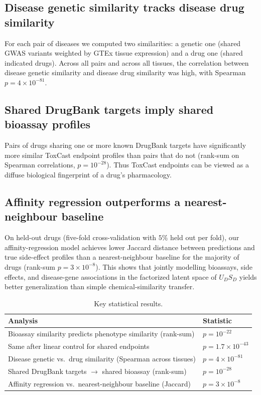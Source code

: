 \documentclass[11pt]{article}
\begin{document}
\subsection{Disease genetic similarity tracks disease drug similarity}
For each pair of diseases we computed two similarities: a genetic one (shared GWAS variants weighted by GTEx tissue expression) and a drug one (shared indicated drugs). Across all pairs and across all tissues, the correlation between disease genetic similarity and disease drug similarity was high, with Spearman $p = 4 \times 10^{-81}$.

\subsection{Shared DrugBank targets imply shared bioassay profiles}
Pairs of drugs sharing one or more known DrugBank targets have significantly more similar ToxCast endpoint profiles than pairs that do not (rank-sum on Spearman correlations, $p = 10^{-28}$). Thus ToxCast endpoints can be viewed as a diffuse biological fingerprint of a drug's pharmacology.

\subsection{Affinity regression outperforms a nearest-neighbour baseline}
On held-out drugs (five-fold cross-validation with $5\%$ held out per fold), our affinity-regression model achieves lower Jaccard distance between predictions and true side-effect profiles than a nearest-neighbour baseline for the majority of drugs (rank-sum $p = 3 \times 10^{-8}$). This shows that jointly modelling bioassays, side effects, and disease-gene associations in the factorized latent space of $U_D S_D$ yields better generalization than simple chemical-similarity transfer.

\begin{table}[h]
\centering
\caption{Key statistical results.}
\label{tab:stats}
\begin{tabular}{ll}
\toprule
Analysis & Statistic \\
\midrule
Bioassay similarity predicts phenotype similarity (rank-sum) & $p = 10^{-22}$ \\
Same after linear control for shared endpoints & $p = 1.7 \times 10^{-43}$ \\
Disease genetic vs.\ drug similarity (Spearman across tissues) & $p = 4 \times 10^{-81}$ \\
Shared DrugBank targets $\to$ shared bioassay (rank-sum) & $p = 10^{-28}$ \\
Affinity regression vs.\ nearest-neighbour baseline (Jaccard) & $p = 3 \times 10^{-8}$ \\
\bottomrule
\end{tabular}
\end{table}
\end{document}
